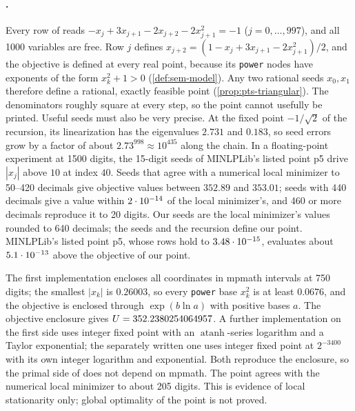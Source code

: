 \paragraph{.}

\begin{remark}\label{rem:lukvle10-seeds}
Every row of  reads $-x_j+3x_{j+1}-2x_{j+2}-2x_{j+1}^2=-1$ ($j=0,\dots,997$), and all 1000 variables are free.
Row $j$ defines $x_{j+2}=(1-x_j+3x_{j+1}-2x_{j+1}^2)/2$, and the objective is defined at every real point, because its \texttt{power} nodes have exponents of the form $x_k^2+1>0$ (\cref{def:sem-model}).
Any two rational seeds $x_0,x_1$ therefore define a rational, exactly feasible point (\cref{prop:pts-triangular}).
The denominators roughly square at every step, so the point cannot usefully be printed.
Useful seeds must also be very precise.
At the fixed point $-1/\sqrt2$ of the recursion, its linearization has the eigenvalues $2.731$ and $0.183$, so seed errors grow by a factor of about $2.73^{998}\approx10^{435}$ along the chain.
In a floating-point experiment at 1500 digits, the 15-digit seeds of MINLPLib's listed point p5 drive $|x_j|$ above $10$ at index $40$.
Seeds that agree with a numerical local minimizer to 50--420 decimals give objective values between $352.89$ and $353.01$; seeds with 440 decimals give a value within $2\cdot 10^{-14}$ of the local minimizer's, and 460 or more decimals reproduce it to 20 digits.
Our seeds are the local minimizer's values rounded to 640 decimals; the seeds and the recursion define our point.
MINLPLib's listed point p5, whose rows hold to $3.48\cdot 10^{-15}$, evaluates about $5.1\cdot 10^{-13}$ above the objective of our point.
\end{remark}

The first implementation encloses all coordinates in mpmath intervals at 750 digits; the smallest $|x_k|$ is $0.26003$, so every \texttt{power} base $x_k^2$ is at least $0.0676$, and the objective is enclosed through $\exp(b\ln a)$ with positive bases $a$.
The objective enclosure gives $U=352.2380254064957$.
A further implementation on the first side uses integer fixed point with an $\operatorname{atanh}$-series logarithm and a Taylor exponential; the separately written one uses integer fixed point at $2^{-3400}$ with its own integer logarithm and exponential.
Both reproduce the enclosure, so the primal side of  does not depend on mpmath.
The point agrees with the numerical local minimizer to about 205 digits.
This is evidence of local stationarity only; global optimality of the point is not proved.


